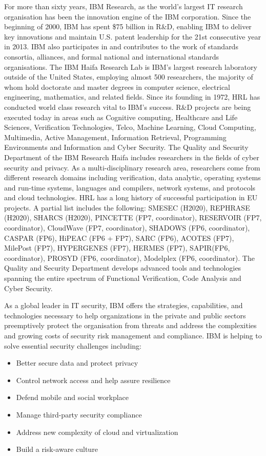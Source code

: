 \documentclass[a4paper,11pt]{article}
\begin{document}
For more than sixty years, IBM Research, as the world's largest IT research organisation has been the innovation engine of the IBM corporation. Since the beginning of 2000, IBM has spent \$75 billion in R\&D, enabling IBM to deliver key innovations and maintain U.S. patent leadership for the 21st consecutive
year in 2013.
IBM also participates in and contributes to the work of standards consortia, alliances, and formal national and international standards organisations. 
The IBM Haifa Research Lab is IBM's largest research laboratory outside of the United States, 
employing almost 500 researchers, the majority of whom hold doctorate and master degrees in computer science, electrical engineering, mathematics, and related fields. Since its founding in 1972, HRL has conducted world class research vital to IBM's success. R\&D projects are being executed today in areas such as Cognitive computing, Healthcare and Life Sciences, Verification Technologies, Telco, Machine Learning, Cloud Computing, Multimedia, Active Management, Information Retrieval, Programming Environments and Information and Cyber Security. The Quality and Security Department of the IBM Research Haifa includes researchers in the fields of cyber security and privacy. As a multi-disciplinary research area, researchers come from different research domains including verification, data analytic, operating systems and run-time systems, languages and compilers, network systems, and protocols and cloud technologies.
HRL has a long history of successful participation in EU projects. A partial list includes the following: SMESEC (H2020), REPHRASE (H2020), SHARCS (H2020), PINCETTE (FP7, coordinator), RESERVOIR (FP7, coordinator), CloudWave (FP7, coordinator), SHADOWS (FP6, coordinator), CASPAR (FP6), HiPEAC (FP6 + FP7), SARC (FP6), ACOTES (FP7), MilePost (FP7), HYPERGENES (FP7), HERMES (FP7), SAPIR(FP6, coordinator), PROSYD (FP6, coordinator), Modelplex (FP6, coordinator).
The Quality and Security Department develops advanced tools and technologies spanning the entire spectrum of Functional Verification, Code Analysis and Cyber Security.

As a global leader in IT security, IBM offers the strategies, capabilities, and technologies necessary to help organizations in the private and public sectors preemptively protect the organisation from threats and address the complexities and growing costs of security risk management and compliance. IBM is helping to solve essential security challenges including:
\begin{itemize}
\item Better secure data and protect privacy
\item Control network access and help assure resilience
\item Defend mobile and social workplace
\item Manage third-party security compliance
\item Address new complexity of cloud and virtualization
\item Build a risk-aware culture
\end{itemize} 	
\end{document}
